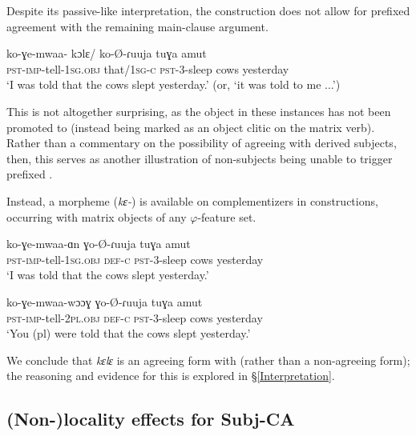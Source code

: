 \documentclass[output=paper
,newtxmath
,modfonts
,nonflat]{langsci/langscibook}
\begin{document}
Despite its passive-like interpretation, the  construction does not allow for prefixed agreement with the remaining main-clause argument.

\ea
\gll ko-ɣe-mwaa- kɔlɛ/ ko-\O-ɾuuja tuɣa amut \\
\textsc{pst-imp}-tell-1\textsc{sg}.\textsc{obj} that/1\textsc{sg-c} \textsc{pst}-3-sleep cows yesterday \\ 
\glt `I was told that the cows slept yesterday.' (or, `it was told to me ...')
\z

\noindent This is not altogether surprising, as the object in these instances has not been promoted to  (instead being marked as an object clitic on the matrix verb). Rather than a commentary on the possibility of agreeing with derived subjects, then, this serves as another illustration of non-subjects being unable to trigger prefixed . 

Instead, a  morpheme (\textit{kɛ-}) is available on complementizers in  constructions, occurring with  matrix objects of any $\varphi$-feature set. 

\ea \label{keleExamples}
\begin{xlist}

\ex 
\gll ko-ɣe-mwaa-ɑn  ɣo-\O-ɾuuja tuɣa amut \\
\textsc{pst-imp}-tell-1\textsc{sg}.\textsc{obj} \textsc{def}-\textsc{c} \textsc{pst}-3-sleep cows yesterday \\
\glt `I was told that the cows slept yesterday.'
	
\ex 
\gll ko-ɣe-mwaa-wɔɔɣ  ɣo-\O-ɾuuja tuɣa amut \\
\textsc{pst}-\textsc{imp}-tell-2\textsc{pl}.\textsc{obj} \textsc{def}-\textsc{c} \textsc{pst}-3-sleep cows yesterday \\
\glt `You (pl) were told that the cows slept yesterday.'

\end{xlist}
\z

\noindent We conclude that \textit{kɛlɛ} is an agreeing form with  (rather than a non-agreeing form); the reasoning and evidence for this is explored in  \S \ref{Interpretation}.

\subsection{(Non-)locality effects for Subj-CA} \label{Non Locality}
\end{document}

